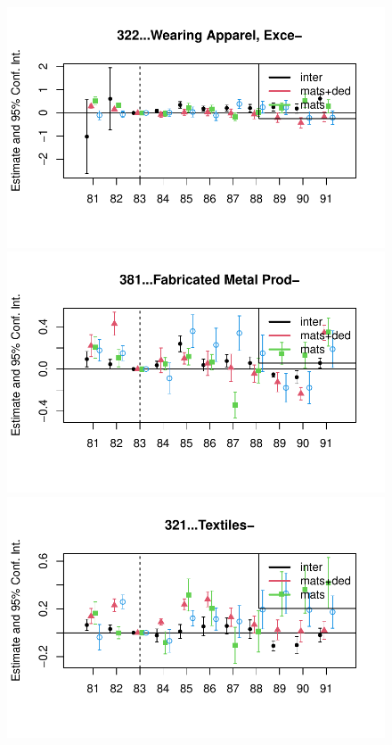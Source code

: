 \documentclass[
  12pt]{article}
\theoremstyle{definition}
\theoremstyle{remark}
\begin{document}
\begin{figure}

\begin{minipage}{\linewidth}

\includegraphics{Tax-Prod_files/figure-pdf/unnamed-chunk-11-1.pdf}

\includegraphics{Tax-Prod_files/figure-pdf/unnamed-chunk-11-2.pdf}

\includegraphics{Tax-Prod_files/figure-pdf/unnamed-chunk-11-3.pdf}


\end{minipage}
\end{figure}
\end{document}
